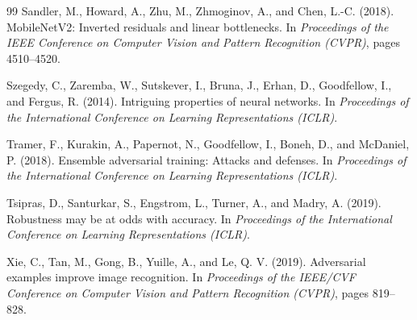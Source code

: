 \documentclass[12pt,a4paper,oneside]{report}
\begin{document}
\begin{thebibliography}{99}
Sandler, M., Howard, A., Zhu, M., Zhmoginov, A., and Chen, L.-C. (2018).
\newblock MobileNetV2: Inverted residuals and linear bottlenecks.
\newblock In \emph{Proceedings of the IEEE Conference on Computer Vision and Pattern Recognition (CVPR)}, pages 4510--4520.

Szegedy, C., Zaremba, W., Sutskever, I., Bruna, J., Erhan, D., Goodfellow, I., and Fergus, R. (2014).
\newblock Intriguing properties of neural networks.
\newblock In \emph{Proceedings of the International Conference on Learning Representations (ICLR)}.

Tramer, F., Kurakin, A., Papernot, N., Goodfellow, I., Boneh, D., and McDaniel, P. (2018).
\newblock Ensemble adversarial training: Attacks and defenses.
\newblock In \emph{Proceedings of the International Conference on Learning Representations (ICLR)}.

Tsipras, D., Santurkar, S., Engstrom, L., Turner, A., and Madry, A. (2019).
\newblock Robustness may be at odds with accuracy.
\newblock In \emph{Proceedings of the International Conference on Learning Representations (ICLR)}.

Xie, C., Tan, M., Gong, B., Yuille, A., and Le, Q. V. (2019).
\newblock Adversarial examples improve image recognition.
\newblock In \emph{Proceedings of the IEEE/CVF Conference on Computer Vision and Pattern Recognition (CVPR)}, pages 819--828.

\end{thebibliography}
\end{document}
